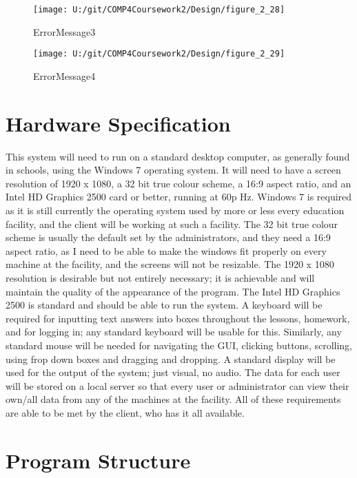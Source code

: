 \begin{figure}[H]
    \label{fig:print_function_result}\caption{ErrorMessage3}
    \texttt{[image: U:/git/COMP4Coursework2/Design/figure\_2\_28]}
\end{figure}

\begin{figure}[H]
    \label{fig:print_function_result}\caption{ErrorMessage4}
    \texttt{[image: U:/git/COMP4Coursework2/Design/figure\_2\_29]}
\end{figure}

\section{Hardware Specification}

This system will need to run on a standard desktop computer, as generally found in schools, using the Windows 7 operating system. It will need to have a screen resolution of 1920 x 1080, a 32 bit true colour scheme, a 16:9 aspect ratio, and an Intel HD Graphics 2500 card or better, running at 60p Hz. Windows 7 is required as it is still currently the operating system used by more or less every education facility, and the client will be working at such a facility. The 32 bit true colour scheme is usually the default set by the administrators, and they need a 16:9 aspect ratio, as I need to be able to make the windows fit properly on every machine at the facility, and the screens will not be resizable. The 1920 x 1080 resolution is desirable but not entirely necessary; it is achievable and will maintain the quality of the appearance of the program. The Intel HD Graphics 2500 is standard and should be able to run the system. A keyboard will be required for inputting text answers into boxes throughout the lessons, homework, and for logging in; any standard keyboard will be usable for this. Similarly, any standard mouse will be needed for navigating the GUI, clicking buttons, scrolling, using frop down boxes and dragging and dropping. A standard display will be used for the output of the system; just visual, no audio. The data for each user will be stored on a local server so that every user or administrator can view their own/all data from any of the machines at the facility. All of these requirements are able to be met by the client, who has it all available.

\section{Program Structure}

